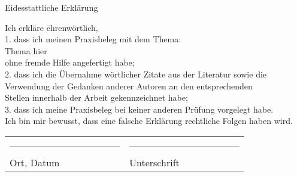 

	\begin{titlepage}
	
	
		\begin{bfseries}
			\begin{center}
				\Huge{Eidesstattliche Erklärung}\\[3cm]
			\end{center}
		\end{bfseries}
		
		\begin{tabbing}
		Ich erkläre \= ehrenwörtlich,\\[1cm]
		1. 	\> dass ich meinen Praxisbeleg mit dem Thema:\\[1cm]
		   	\> Thema hier\\[1cm]
		ohne fremde Hilfe angefertigt habe;\\[1cm]
		
		2.	\> dass ich die Übernahme wörtlicher Zitate aus der Literatur sowie die\\ 		  
			\>Verwendung der Gedanken anderer Autoren an den entsprechenden\\
			\> Stellen innerhalb der Arbeit gekennzeichnet habe;\\[0.5cm]
		
		3.	\> dass ich meine Praxisbeleg bei keiner anderen Prüfung vorgelegt habe. \\[1cm]
		Ich bin mir bewusst, dass eine falsche Erklärung rechtliche Folgen haben wird. \\[2cm]
		\end{tabbing}
		
		 \begin{tabular}{p{8cm}l}
		  ----------------------------------- &  ----------------------------------- \\
		  Ort, Datum & Unterschrift  \\
		 \end{tabular}
	\end{titlepage}